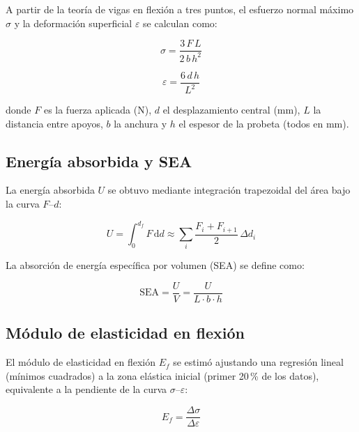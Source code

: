 \documentclass[12pt, a4paper, twocolumn]{article}
\begin{document}
A partir de la teoría de vigas en flexión a tres puntos, el esfuerzo normal máximo
$\sigma$ y la deformación superficial $\varepsilon$ se calculan como:

\begin{equation}
    \sigma = \frac{3\,F\,L}{2\,b\,h^{2}}
    \label{eq:esfuerzo}
\end{equation}

\begin{equation}
    \varepsilon = \frac{6\,d\,h}{L^{2}}
    \label{eq:deformacion}
\end{equation}

donde $F$ es la fuerza aplicada (\si{N}), $d$ el desplazamiento central (\si{mm}), $L$
la distancia entre apoyos, $b$ la anchura y $h$ el espesor de la probeta (todos en
\si{mm}).

\subsection{Energía absorbida y SEA}

La energía absorbida $U$ se obtuvo mediante integración trapezoidal del área bajo la
curva $F$--$d$:

\begin{equation}
    U = \int_0^{d_f} F\,\mathrm{d}d \approx \sum_{i} \frac{F_i + F_{i+1}}{2}\,\Delta d_i
    \label{eq:energia}
\end{equation}

La absorción de energía específica por volumen (SEA) se define como:

\begin{equation}
    \mathrm{SEA} = \frac{U}{V} = \frac{U}{L \cdot b \cdot h}
    \label{eq:sea}
\end{equation}

\subsection{Módulo de elasticidad en flexión}

El módulo de elasticidad en flexión $E_f$ se estimó ajustando una regresión lineal
(mínimos cuadrados) a la zona elástica inicial (primer 20\,\% de los datos), equivalente
a la pendiente de la curva $\sigma$--$\varepsilon$:

\begin{equation}
    E_f = \frac{\Delta\sigma}{\Delta\varepsilon}
    \label{eq:modulo}
\end{equation}

\end{document}

